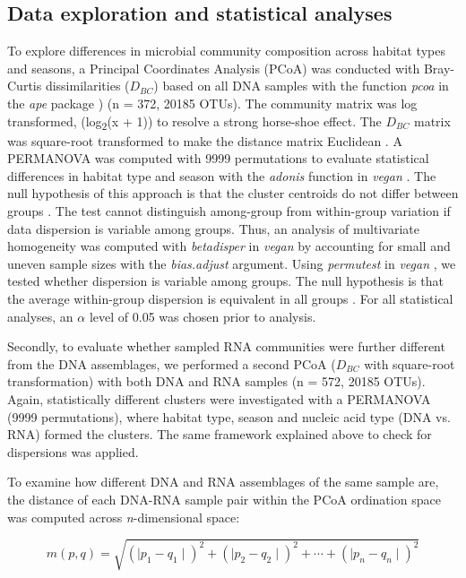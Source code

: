 \documentclass[12pt,a4paper]{article} %
\begin{document}
\subsection*{Data exploration and statistical analyses}
To explore differences in microbial community composition across habitat types and seasons, a Principal Coordinates Analysis (PCoA) was conducted with Bray-Curtis dissimilarities ($D_{BC}$) \citep{Bray1957, Legendre1998} based on all DNA samples with the function \textit{pcoa} in the \textit{ape} package \citep{Paradis2018}) (n = 372, 20185 OTUs). The community matrix was log transformed, (log\textsubscript{2}(x + 1)) to resolve a strong horse-shoe effect. The $D_{BC}$ matrix was square-root transformed to make the distance matrix Euclidean \citep{Legendre1998, Borcard2011}. A PERMANOVA was computed with 9999 permutations to evaluate statistical differences in habitat type and season  with the \textit{adonis} function in \textit{vegan} \citep{Oksanen2017}. The null hypothesis of this approach is that the cluster centroids do not differ between groups \citep{Anderson2013}. The test cannot distinguish among-group from within-group variation if data dispersion is variable among groups. Thus, an analysis of multivariate homogeneity was computed with \textit{betadisper} in \textit{vegan} \citep{Oksanen2017} by accounting for small and uneven sample sizes with the \textit{bias.adjust} argument. Using \textit{permutest} in \textit{vegan} \citep{Oksanen2017}, we tested whether dispersion is variable among groups. The null hypothesis is that the average within-group dispersion is equivalent in all groups \citep{Anderson2013}. For all statistical analyses, an $\alpha$ level of 0.05 was chosen prior to analysis.

Secondly, to evaluate whether sampled RNA communities were further different from the DNA assemblages, we performed a second PCoA ($D_{BC}$ with square-root transformation) with both DNA and RNA samples (n = 572, 20185 OTUs). Again, statistically different clusters were investigated with a PERMANOVA (9999 permutations), where habitat type, season and nucleic acid type (DNA vs. RNA) formed the clusters. The same framework explained above to check for dispersions was applied.

To examine how different DNA and RNA assemblages of the same sample are, the distance of each DNA-RNA sample pair within the PCoA ordination space was computed across \textit{n}-dimensional space:


\[ m(p,q) = \sqrt{(\mid p_{1} - q_{1} \mid)^2 + (\mid p_{2} - q_{2} \mid)^2 + \cdots + (\mid p_{n} - q_{n} \mid)^2}\]
\end{document}
